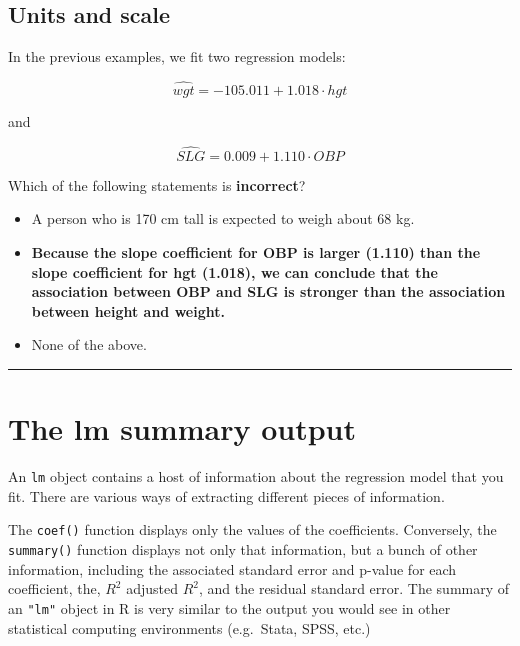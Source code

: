 \documentclass[
]{book}
\begin{document}
\hypertarget{units-and-scale}{%
\subsection*{Units and scale}\label{units-and-scale}}

In the previous examples, we fit two regression models:

\begin{equation}
\widehat{wgt} = −105.011 + 1.018 \cdot hgt
\end{equation}

and

\begin{equation}
\widehat{SLG}= 0.009 + 1.110 \cdot OBP
\end{equation}

Which of the following statements is \textbf{incorrect}?

\begin{itemize}
\item
  A person who is 170 cm tall is expected to weigh about 68 kg.
\item
  \textbf{Because the slope coefficient for OBP is larger (1.110) than the slope coefficient for hgt (1.018), we can conclude that the association between OBP and SLG is stronger than the association between height and weight.}
\item
  None of the above.
\end{itemize}

\begin{center}\rule{0.5\linewidth}{0.5pt}\end{center}

\hypertarget{the-lm-summary-output}{%
\section{The lm summary output}\label{the-lm-summary-output}}

An \texttt{lm} object contains a host of information about the regression model that you fit. There are various ways of extracting different pieces of information.

The \texttt{coef()} function displays only the values of the coefficients. Conversely, the \texttt{summary()} function displays not only that information, but a bunch of other information, including the associated standard error and p-value for each coefficient, the, \(R^2\) adjusted \(R^2\), and the residual standard error. The summary of an \texttt{"lm"} object in R is very similar to the output you would see in other statistical computing environments (e.g.~Stata, SPSS, etc.)
\end{document}
